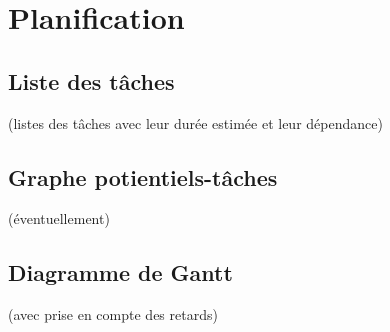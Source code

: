 \documentclass[french]{article}
\begin{document}
		\section{Planification}
			\subsection{Liste des tâches}
				(listes des tâches avec leur durée estimée et leur dépendance)
			\subsection{Graphe potientiels-tâches}
				(éventuellement)
			\subsection{Diagramme de Gantt}
				(avec prise en compte des retards)
			
\end{document}
